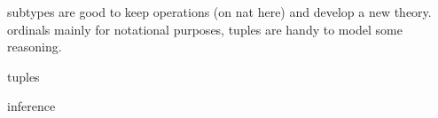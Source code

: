 subtypes are good to keep operations (on nat here) and develop
a new theory.  ordinals mainly for notational purposes, tuples
are handy to model some reasoning.

\mcbLEARN{}
\mcbNOTES{}

tuples

inference

%
%
%
%

